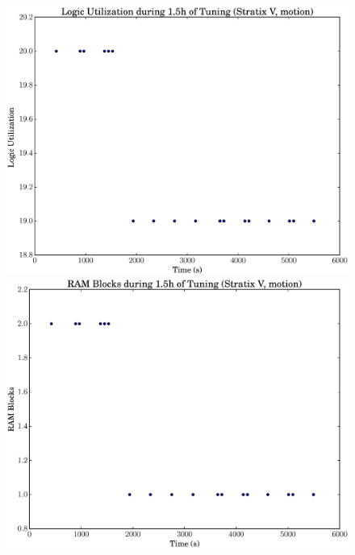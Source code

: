 \documentclass[12pt, a4paper]{article}
\begin{document}
\begin{figure}[htpb]
    \centering
    \noindent
    \begin{minipage}{.48\textwidth}
        \centering
        \includegraphics[scale=.25]{motion_lu_5400_chstone_StratixV}
    \end{minipage}%
    \hfill
    \begin{minipage}{.48\textwidth}
        \centering
        \includegraphics[scale=.25]{motion_ram_5400_chstone_StratixV}
    \end{minipage}%


\end{figure}
\end{document}
